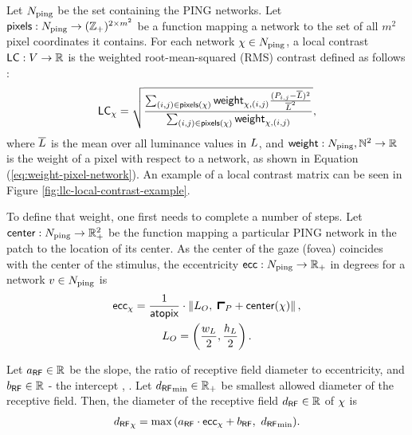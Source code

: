 Let $N_{\mathrm{ping}}$ be the set containing the PING networks. Let $\mathsf{pixels}: N_{\mathrm{ping}} \to (\mathbb{Z}_+)^{2 \times m^2}$ be a function mapping a network to the set of all $m^2$ pixel coordinates it contains.
For each network $\chi \in N_{\mathrm{ping}}$, a local contrast $\mathsf{LC}: V \to \mathbb{R}$ is the weighted root-mean-squared (RMS) contrast defined as follows \cite{Frazor2006}:
\begin{equation}
    \mathsf{LC}_\chi = \sqrt{
        \frac{
            \sum_{(i, j) \in \mathsf{pixels}(\chi)} \mathsf{weight}_{\chi, (i, j)} \frac{(P_{i, j} - \overline{L})^2}{\overline{L}^2}
        }{
            \sum_{(i, j) \in \mathsf{pixels}(\chi)} \mathsf{weight}_{\chi, (i, j)}
        }
    },
\end{equation}
where $\overline{L}$ is the mean over all luminance values in $L$, and $\mathsf{weight}: N_{\mathrm{ping}}, \mathbb{N}^2 \to \mathbb{R}$ is the weight of a pixel with respect to a network, as shown in Equation (\ref{eq:weight-pixel-network}). An example of a local contrast matrix can be seen in Figure \ref{fig:llc-local-contrast-example}.

To define that weight, one first needs to complete a number of steps.
Let $\mathsf{center} : N_{\mathrm{ping}} \to \mathbb{R}_+^2$ be the function mapping a particular PING network in the patch to the location of its center. As the center of the gaze (fovea) coincides with the center of the stimulus, the eccentricity $\mathsf{ecc}: N_{\mathrm{ping}} \to \mathbb{R}_+$ in degrees for a network $v \in N_{\mathrm{ping}}$ is
\begin{equation}
\begin{gathered}
    \ecc_{\pingnet} = \frac{1}{\atopix} \cdot \left\| \stimcenter, \ \patchstart + \centr(\pingnet) \right\|, \\
    \stimcenter = \left( \frac{\fullwidth}{2}, \frac{\fullheight}{2}   \right).
\end{gathered}
\end{equation}

Let $a_\mathsf{RF} \in \mathbb{R}$ be the slope, the ratio of receptive field diameter to eccentricity, and $b_\mathsf{RF} \in \mathbb{R}$ - the intercept \cite{MaryamPLACEHOLDER}, \cite{Freeman2011}.
Let ${d_\mathsf{RF}}_{\min} \in \mathbb{R}_+$ be smallest allowed diameter of the receptive field.
Then, the diameter of the receptive field ${d_\mathsf{RF}} \in \mathbb{R}$ of $\chi$ is 
\begin{equation}
    {d_\mathsf{RF}}_\chi = \max{( a_\mathsf{RF}\cdot \mathsf{ecc}_\chi+ b_\mathsf{RF}, \ {d_\mathsf{RF}}_{\min} )}.
\end{equation}

